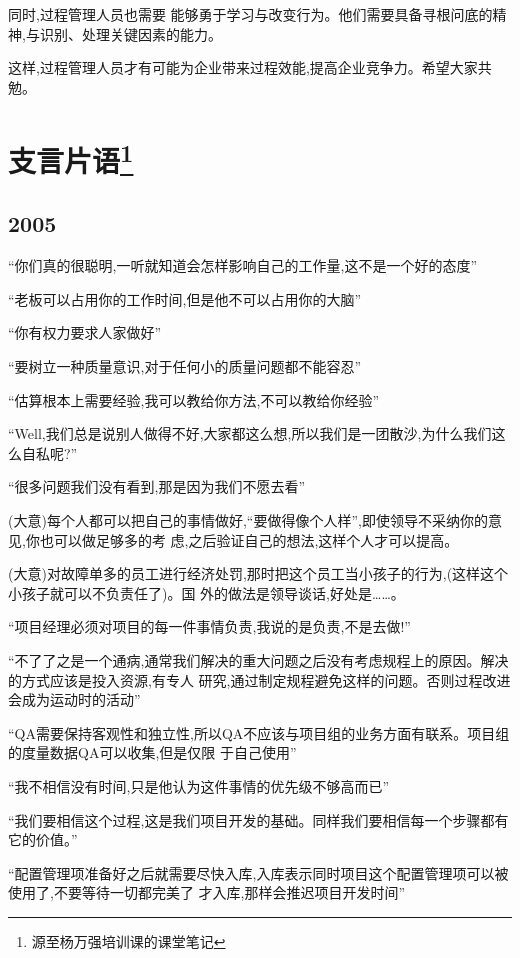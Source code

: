 \documentclass[11pt]{article}
\begin{document}
同时,过程管理人员也需要 能够勇于学习与改变行为。他们需要具备寻根问底的精神,与识别、处理关键因素的能力。

这样,过程管理人员才有可能为企业带来过程效能,提高企业竞争力。希望大家共勉。

\pagebreak
\section{支言片语\footnote{\textsf{源至杨万强培训课的课堂笔记}}}
\subsection{2005}

``你们真的很聪明,一听就知道会怎样影响自己的工作量,这不是一个好的态度''

``老板可以占用你的工作时间,但是他不可以占用你的大脑''

``你有权力要求人家做好''

``要树立一种质量意识,对于任何小的质量问题都不能容忍''

``估算根本上需要经验,我可以教给你方法,不可以教给你经验''

``Well,我们总是说别人做得不好,大家都这么想,所以我们是一团散沙,为什么我们这么自私呢?''

``很多问题我们没有看到,那是因为我们不愿去看''

(大意)每个人都可以把自己的事情做好,``要做得像个人样'',即使领导不采纳你的意见,你也可以做足够多的考
虑,之后验证自己的想法,这样个人才可以提高。

(大意)对故障单多的员工进行经济处罚,那时把这个员工当小孩子的行为,(这样这个小孩子就可以不负责任了)。国
外的做法是领导谈话,好处是……。

``项目经理必须对项目的每一件事情负责,我说的是负责,不是去做!''

``不了了之是一个通病,通常我们解决的重大问题之后没有考虑规程上的原因。解决的方式应该是投入资源,有专人
研究,通过制定规程避免这样的问题。否则过程改进会成为运动时的活动''

``QA需要保持客观性和独立性,所以QA不应该与项目组的业务方面有联系。项目组的度量数据QA可以收集,但是仅限
于自己使用''

``我不相信没有时间,只是他认为这件事情的优先级不够高而已''

``我们要相信这个过程,这是我们项目开发的基础。同样我们要相信每一个步骤都有它的价值。''

``配置管理项准备好之后就需要尽快入库,入库表示同时项目这个配置管理项可以被使用了,不要等待一切都完美了
才入库,那样会推迟项目开发时间''
\end{document}
